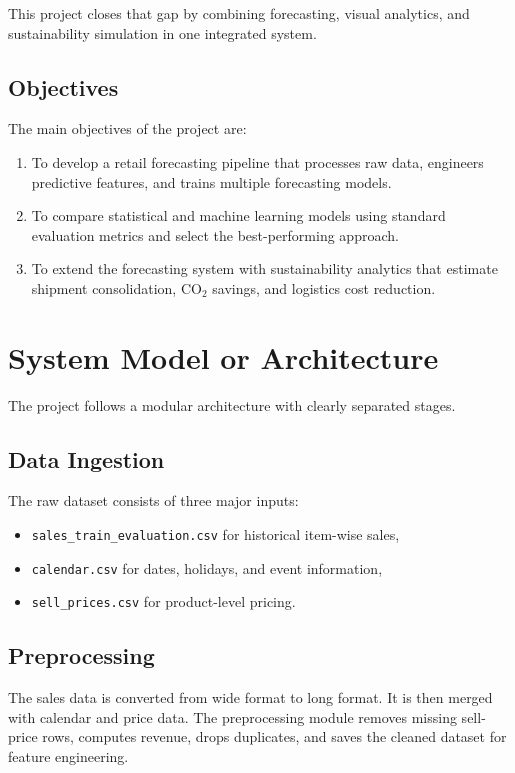 \documentclass[12pt,a4paper]{article}
\begin{document}
This project closes that gap by combining forecasting, visual analytics, and sustainability simulation in one integrated system.

\subsection{Objectives}
The main objectives of the project are:
\begin{enumerate}[leftmargin=*]
    \item To develop a retail forecasting pipeline that processes raw data, engineers predictive features, and trains multiple forecasting models.
    \item To compare statistical and machine learning models using standard evaluation metrics and select the best-performing approach.
    \item To extend the forecasting system with sustainability analytics that estimate shipment consolidation, CO$_2$ savings, and logistics cost reduction.
\end{enumerate}

\section{System Model or Architecture}
The project follows a modular architecture with clearly separated stages.

\subsection{Data Ingestion}
The raw dataset consists of three major inputs:
\begin{itemize}[leftmargin=*]
    \item \texttt{sales\_train\_evaluation.csv} for historical item-wise sales,
    \item \texttt{calendar.csv} for dates, holidays, and event information,
    \item \texttt{sell\_prices.csv} for product-level pricing.
\end{itemize}

\subsection{Preprocessing}
The sales data is converted from wide format to long format. It is then merged with calendar and price data. The preprocessing module removes missing sell-price rows, computes revenue, drops duplicates, and saves the cleaned dataset for feature engineering.
\end{document}
